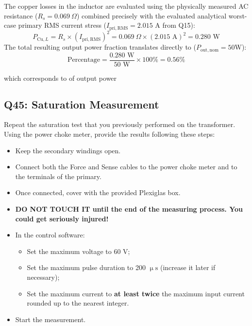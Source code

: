 \documentclass{PELsmallreport}
\begin{document}
\begin{framed}
	\vspace{2em}
The copper losses in the inductor are evaluated using the physically measured AC resistance ($R_s = 0.069\ \Omega$) combined precisely with the evaluated analytical worst-case primary RMS current stress ($I_\mathrm{pri,RMS} = 2.015\text{ A}$ from Q15):
\[ P_{\mathrm{Cu},L} = R_s \times (I_\mathrm{pri,RMS})^2 = 0.069\ \Omega \times (2.015\text{ A})^2 = 0.280\text{ W} \]
The total resulting output power fraction translates directly to ($P_\mathrm{out,nom} = 50\text{W}$):
\[ \text{Percentage} = \frac{0.280\text{ W}}{50\text{ W}} \times 100\% = 0.56\% \]
	\vspace{2em}
\end{framed}

 which corresponds to  of output power \hfill{}





\subsection{Q45: Saturation Measurement} 
Repeat the saturation test that you previously performed on the transformer.  
Using the power choke meter, provide the results following these steps: 
\begin{itemize}
    \item Keep the secondary windings open.
    \item Connect both the Force and Sense cables to the power choke meter and to the terminals of the primary.
    \item Once connected, cover with the provided Plexiglas box.
    \item \textbf{DO NOT TOUCH IT until the end of the measuring process. You could get seriously injured!}
    \item In the control software: 
    \begin{itemize}
        \item Set the maximum voltage to 60 V;
        \item Set the maximum pulse duration to 200 $\upmu \mathrm{s}$ (increase it later if necessary);
        \item Set the maximum current to \textbf{at least twice} the maximum input current rounded up to the nearest integer. 
    \end{itemize}
    \item Start the measurement.
\end{itemize}
\end{document}
